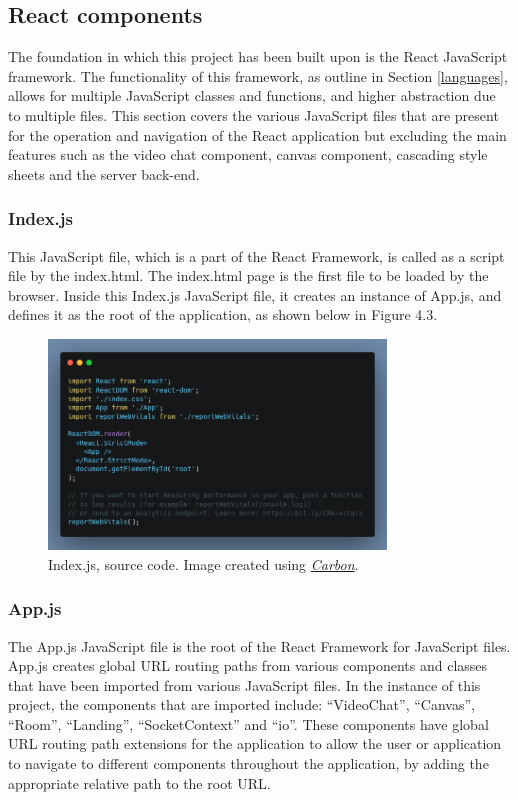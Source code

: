 \subsection{React components}
The foundation in which this project has been built upon is the React JavaScript framework. The functionality of this framework, as outline in Section \ref{languages}, allows for multiple JavaScript classes and functions, and higher abstraction due to multiple files. This section covers the various JavaScript files that are present for the operation and navigation of the React application but excluding the main features such as the video chat component, canvas component, cascading style sheets and the server back-end.

\subsubsection{Index.js}
This JavaScript file, which is a part of the React Framework, is called as a script file by the index.html. The index.html page is the first file to be loaded by the browser. Inside this Index.js JavaScript file, it creates an instance of App.js, and defines it as the root of the application, as shown below in Figure 4.3.
\begin{figure}[H]
    \centering
    \includegraphics[width=0.8\textwidth]{img/SystemDesign/indexJs.png}
    \caption{Index.js, source code. Image created using \href{https://carbon.now.sh/}{\textit{Carbon}}.}
\end{figure}

\subsubsection{App.js}
The App.js JavaScript file is the root of the React Framework for JavaScript files. App.js creates global URL routing paths from various components and classes that have been imported from various JavaScript files. In the instance of this project, the components that are imported include: “VideoChat”, “Canvas”, “Room”, “Landing”, “SocketContext” and “io”. These components have global URL routing path extensions for the application to allow the user or application to navigate to different components throughout the application, by adding the appropriate relative path to the root URL.

